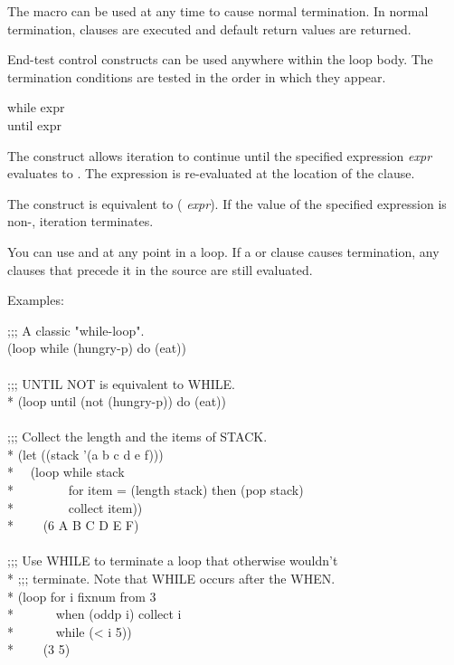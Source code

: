 The macro  can be used at any time to cause normal
termination.  In normal termination,  clauses are 
executed and default return values are returned.

End-test control constructs can be used anywhere within the loop
body.  The termination conditions are tested in the order in which
they appear.

\begin{defloop}
while expr \\
until expr

The  construct allows iteration to continue until the specified
expression {\it expr} evaluates to .  The expression
is re-evaluated at the location of the  clause.

The  construct is equivalent to 
{ ( {\it expr})}.  If the value of the
specified expression is non-, iteration terminates.

You can use  and  
at any point in a loop.  If a  or  clause causes
termination, any clauses that precede it in the source
are still evaluated.  

Examples:
\begin{lisp}
;;; A classic "while-loop". \\
(loop while (hungry-p) do (eat)) \\
 \\
;;; UNTIL NOT is equivalent to WHILE. \\*
(loop until (not (hungry-p)) do (eat)) \\
 \\
;;; Collect the length and the items of STACK. \\*
(let ((stack '(a b c d e f))) \\*
~~(loop while stack \\*
~~~~~~~~for item = (length stack) then (pop stack) \\*
~~~~~~~~collect item)) \\*
~~~\EV~(6 A B C D E F) \\
 \\
;;; Use WHILE to terminate a loop that otherwise wouldn't \\*
;;; terminate.  Note that WHILE occurs after the WHEN. \\*
(loop for i fixnum from 3 \\*
~~~~~~when (oddp i) collect i \\*
~~~~~~while (< i 5)) \\*
~~~\EV~(3 5)
\end{lisp}
\end{defloop}


